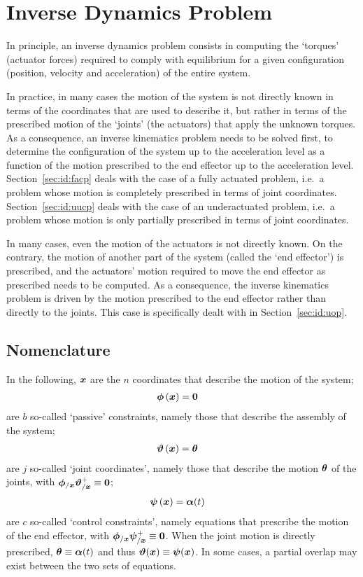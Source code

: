 \section{Inverse Dynamics Problem}
In principle, an inverse dynamics problem consists in computing the `torques'
(actuator forces) required to comply with equilibrium for a given configuration
(position, velocity and acceleration) of the entire system.

In practice, in many cases the motion of the system is not directly known
in terms of the coordinates that are used to describe it,
but rather in terms of the prescribed motion of the `joints' (the actuators)
that apply the unknown torques.
As a consequence, an inverse kinematics problem needs to be solved first,
to determine the configuration of the system up to the acceleration level
as a function of the motion prescribed to the end effector
up to the acceleration level.
Section~\ref{sec:id:facp} deals with the case of a fully actuated problem,
i.e.\ a problem whose motion is completely prescribed in terms
of joint coordinates.
Section~\ref{sec:id:uucp} deals with the case of an underactuated problem,
i.e.\ a problem whose motion is only partially prescribed in terms
of joint coordinates.

In many cases, even the motion of the actuators is not directly known.
On the contrary, the motion of another part of the system
(called the `end effector') is prescribed, and the actuators' motion
required to move the end effector as prescribed needs to be computed.
As a consequence, the inverse kinematics problem is driven
by the motion prescribed to the end effector rather than directly
to the joints.
This case is specifically dealt with in Section~\ref{sec:id:uop}.

\subsection{Nomenclature}
In the following, $\bm{x}$ are the $n$ coordinates that describe
the motion of the system;
\begin{align}
	\bm{\phi}\left( \bm{x} \right)
	&=
	\bm{0}
\end{align}
are $b$ so-called `passive' constraints, namely those that describe
the assembly of the system;
\begin{align}
	\bm{\vartheta}\left( \bm{x} \right)
	&=
	\bm{\theta}
\end{align}
are $j$ so-called `joint coordinates', namely those that describe
the motion $\bm{\theta}$ of the joints,
with $\bm{\phi}_{/\bm{x}} \bm{\vartheta}_{/\bm{x}}^+ \equiv \bm{0}$;
\begin{align}
	\bm{\psi}\left( \bm{x} \right)
	&=
	\bm{\alpha}(t)
\end{align}
are $c$ so-called `control constraints', namely equations that prescribe
the motion of the end effector,
with $\bm{\phi}_{/\bm{x}} \bm{\psi}_{/\bm{x}}^+ \equiv \bm{0}$.
When the joint motion is directly prescribed,
$\bm{\theta} \equiv \bm{\alpha}(t)$
and thus
$\bm{\vartheta}(\bm{x}) \equiv \bm{\psi}(\bm{x})$.
In some cases, a partial overlap may exist between the two sets of equations.



